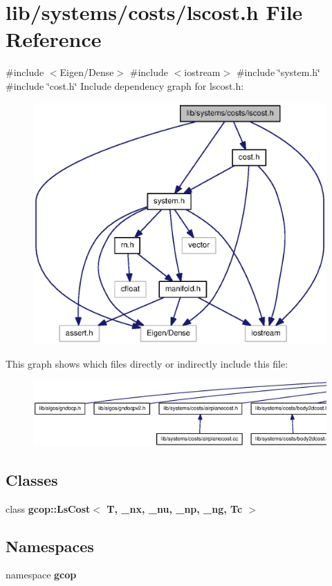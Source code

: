 \section{lib/systems/costs/lscost.h \-File \-Reference}
\label{lscost_8h}
{\ttfamily \#include $<$\-Eigen/\-Dense$>$}\*
{\ttfamily \#include $<$iostream$>$}\*
{\ttfamily \#include \char`\"{}system.\-h\char`\"{}}\*
{\ttfamily \#include \char`\"{}cost.\-h\char`\"{}}\*
\-Include dependency graph for lscost.\-h\-:
\nopagebreak
\begin{figure}[H]
\begin{center}
\leavevmode
\includegraphics[width=350pt]{lscost_8h__incl}
\end{center}
\end{figure}
\-This graph shows which files directly or indirectly include this file\-:
\nopagebreak
\begin{figure}[H]
\begin{center}
\leavevmode
\includegraphics[width=350pt]{lscost_8h__dep__incl}
\end{center}
\end{figure}
\subsection*{\-Classes}
\begin{DoxyCompactItemize}
\item 
class {\bf gcop\-::\-Ls\-Cost$<$ T, \-\_\-nx, \-\_\-nu, \-\_\-np, \-\_\-ng, Tc $>$}
\end{DoxyCompactItemize}
\subsection*{\-Namespaces}
\begin{DoxyCompactItemize}
\item 
namespace {\bf gcop}
\end{DoxyCompactItemize}

